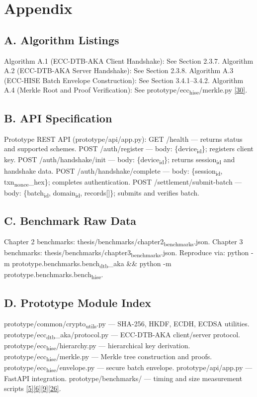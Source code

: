 \chapter{Appendix}
\label{ch:appendix}

\section{A. Algorithm Listings}

\indent Algorithm A.1 (ECC-DTB-AKA Client Handshake): See Section 2.3.7. Algorithm A.2 (ECC-DTB-AKA Server Handshake): See Section 2.3.8. Algorithm A.3 (ECC-HISE Batch Envelope Construction): See Section 3.4.1--3.4.2. Algorithm A.4 (Merkle Root and Proof Verification): See prototype/ecc\textsubscript{hise}/merkle.py \hyperref[ref:30]{[30]}.

\section{B. API Specification}

\indent Prototype REST API (prototype/api/app.py): GET /health --- returns status and supported schemes. POST /auth/register --- body: \{device\textsubscript{id}\}; registers client key. POST /auth/handshake/init --- body: \{device\textsubscript{id}\}; returns session\textsubscript{id} and handshake data. POST /auth/handshake/complete --- body: \{session\textsubscript{id}, txn\textsubscript{nonce}\_hex\}; completes authentication. POST /settlement/submit-batch --- body: \{batch\textsubscript{id}, domain\textsubscript{id}, records[]\}; submits and verifies batch.

\section{C. Benchmark Raw Data}

\indent Chapter 2 benchmarks: thesis/benchmarks/chapter2\textsubscript{benchmarks}.json. Chapter 3 benchmarks: thesis/benchmarks/chapter3\textsubscript{benchmarks}.json. Reproduce via: python -m prototype.benchmarks.bench\textsubscript{dtb}\_aka \&\& python -m prototype.benchmarks.bench\textsubscript{hise}.

\section{D. Prototype Module Index}

\indent prototype/common/crypto\textsubscript{utils}.py --- SHA-256, HKDF, ECDH, ECDSA utilities. prototype/ecc\textsubscript{dtb}\_aka/protocol.py --- ECC-DTB-AKA client/server protocol. prototype/ecc\textsubscript{hise}/hierarchy.py --- hierarchical key derivation. prototype/ecc\textsubscript{hise}/merkle.py --- Merkle tree construction and proofs. prototype/ecc\textsubscript{hise}/envelope.py --- secure batch envelope. prototype/api/app.py --- FastAPI integration. prototype/benchmarks/ --- timing and size measurement scripts \hyperref[ref:5]{[5]}\hyperref[ref:6]{[6]}\hyperref[ref:9]{[9]}\hyperref[ref:26]{[26]}.

